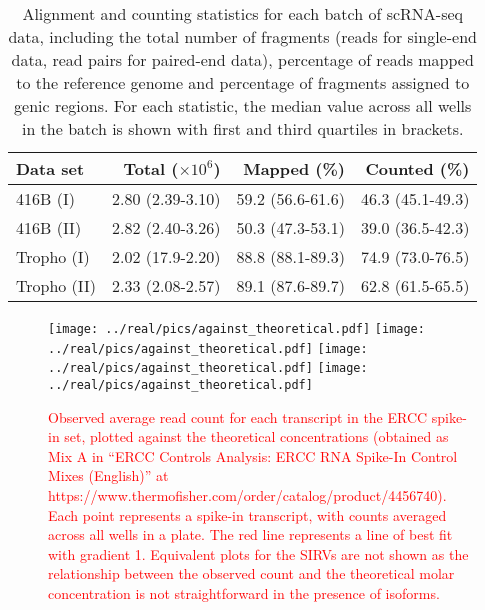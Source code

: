 \documentclass{article}
\newcommand\revised[1]{\textcolor{red}{#1}}
\begin{document}
\begin{table}[btp]
    \caption{Alignment and counting statistics for each batch of scRNA-seq data, including the total number of fragments (reads for single-end data, read pairs for paired-end data), percentage of reads mapped to the reference genome and percentage of fragments assigned to genic regions.
    For each statistic, the median value across all wells in the batch is shown with first and third quartiles in brackets.}
    \begin{center}
        \begin{tabular}{l r r r}
            \hline
            \textbf{Data set} & \textbf{Total ($\times 10^6$)} & \textbf{Mapped (\%)} & \textbf{Counted (\%)} \\
            \hline
            416B (I)  & 2.80 (2.39-3.10) & 59.2 (56.6-61.6) & 46.3 (45.1-49.3) \\
            416B (II) & 2.82 (2.40-3.26) & 50.3 (47.3-53.1) & 39.0 (36.5-42.3) \\
            Tropho (I) & 2.02 (17.9-2.20) & 88.8 (88.1-89.3) & 74.9 (73.0-76.5) \\
            Tropho (II) & 2.33 (2.08-2.57) & 89.1 (87.6-89.7) & 62.8 (61.5-65.5) \\
            \hline
        \end{tabular}
    \end{center}
\end{table}


\begin{figure}[btp]
    \begin{center}
       \texttt{[image: ../real/pics/against\_theoretical.pdf]}
       \texttt{[image: ../real/pics/against\_theoretical.pdf]}
       \texttt{[image: ../real/pics/against\_theoretical.pdf]}
       \texttt{[image: ../real/pics/against\_theoretical.pdf]}
       \caption{\revised{Observed average read count for each transcript in the ERCC spike-in set, plotted against the theoretical concentrations (obtained as Mix A in ``ERCC Controls Analysis: ERCC RNA Spike-In Control Mixes (English)'' at https://www.thermofisher.com/order/catalog/product/4456740).
        Each point represents a spike-in transcript, with counts averaged across all wells in a plate.
        The red line represents a line of best fit with gradient 1.
        Equivalent plots for the SIRVs are not shown as the relationship between the observed count and the theoretical molar concentration is not straightforward in the presence of isoforms.
       }}
    \end{center}
\end{figure}
\end{document}

